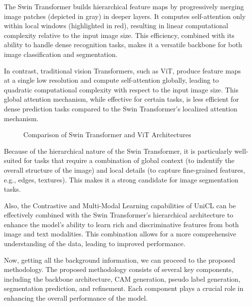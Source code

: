 The Swin Transformer builds hierarchical feature maps by progressively merging image patches (depicted in gray) in deeper layers. It computes self-attention only within local windows (highlighted in red), resulting in linear computational complexity relative to the input image size. This efficiency, combined with its ability to handle dense recognition tasks, makes it a versatile backbone for both image classification and segmentation.

In contrast, traditional vision Transformers, such as ViT, produce feature maps at a single low resolution and compute self-attention globally, leading to quadratic computational complexity with respect to the input image size. This global attention mechanism, while effective for certain tasks, is less efficient for dense prediction tasks compared to the Swin Transformer's localized attention mechanism.

\begin{figure}[htbp]
    \centering
    \caption{Comparison of Swin Transformer and ViT Architectures}
    \label{fig:swin_vs_vit_architecture}
\end{figure}

Because of the hierarchical nature of the Swin Transformer, it is particularly well-suited for tasks that require a combination of global context (to indentify the overall structure of the image) and local details (to capture fine-grained features, e.g., edges, textures). This makes it a strong candidate for image segmentation tasks.

Also, the Contrastive and Multi-Modal Learning capabilities of UniCL can be effectively combined with the Swin Transformer's hierarchical architecture to enhance the model's ability to learn rich and discriminative features from both image and text modalities. This combination allows for a more comprehensive understanding of the data, leading to improved performance.

Now, getting all the background information, we can proceed to the proposed methodology. The proposed methodology consists of several key components, including the backbone architecture, CAM generation, pseudo label generation, segmentation prediction, and refinement. Each component plays a crucial role in enhancing the overall performance of the model.